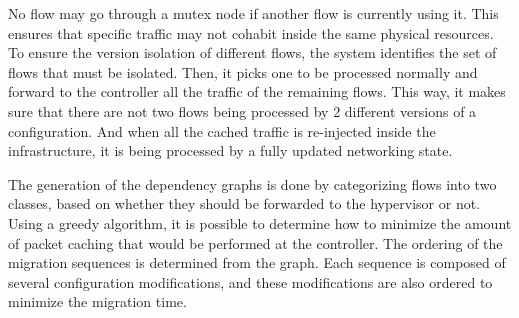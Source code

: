 No flow may go through a mutex node if another flow is currently using it.
This ensures that specific traffic may not cohabit inside the same physical resources.
To ensure the version isolation of different flows, the system identifies the set of flows that must be isolated. Then, it picks one to be processed normally and forward to the controller all the traffic of the remaining flows. This way, it makes sure that there are not two flows being processed by 2 different versions of a configuration. And when all the cached traffic is re-injected inside the infrastructure, it is being processed by a fully updated networking state.

The generation of the dependency graphs is done by categorizing flows into two classes, based on whether they should be forwarded to the hypervisor or not. Using a greedy algorithm, it is possible to determine how to minimize the amount of packet caching that would be performed at the controller.
The ordering of the migration sequences is determined from the graph. Each sequence is composed of several configuration modifications, and these modifications are also ordered to minimize the migration time. 

